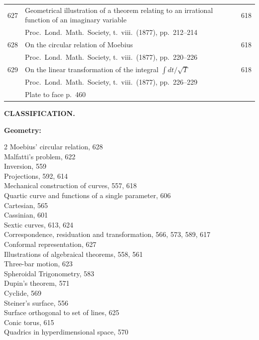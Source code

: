 \documentclass[11pt,a4paper]{book}
\begin{document}
\begin{longtable}{r @{. } p{4.8in} r}
627 & Geometrical illustration of a theorem relating to an irrational function of an imaginary variable & 618 \\
  & Proc.\ Lond.\ Math.\ Society, t.\ viii.\ (1877), pp.\ 212--214 & \\ 

628 & On the circular relation of Moebius & 618 \\
  & Proc.\ Lond.\ Math.\ Society, t.\ viii.\ (1877), pp.\ 220--226 & \\ 

629 & On the linear transformation of the integral $\int dt / \sqrt{T}$ & 618 \\
  & Proc.\ Lond.\ Math.\ Society, t.\ viii.\ (1877), pp.\ 226--229 & \\ 
  & Plate to face p.\ 460 & \\ 
\end{longtable}


\newpage
\setcounter{page}{15}

\begin{center}
{\large \textbf{CLASSIFICATION.}}
\end{center}

\vspace{12pt}

\noindent \textbf{Geometry:}

\begin{multicols}{2}
Moebius' circular relation, 628\\
Malfatti's problem, 622\\
Inversion, 559\\
Projections, 592, 614\\
Mechanical construction of curves, 557, 618\\
Quartic curve and functions of a single parameter, 606\\
Cartesian, 565\\
Cassinian, 601\\
Sextic curves, 613, 624\\
Correspondence, residuation and transformation, 566, 573, 589, 617\\
Conformal representation, 627\\
Illustrations of algebraical theorems, 558, 561\\
Three-bar motion, 623\\
Spheroidal Trigonometry, 583\\
Dupin's theorem, 571\\
Cyclide, 569\\
Steiner's surface, 556\\
Surface orthogonal to set of lines, 625\\
Conic torus, 615\\
Quadrics in hyperdimensional space, 570\\
\end{multicols}
\end{document}
